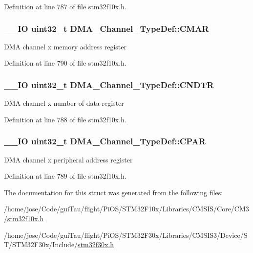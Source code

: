 Definition at line 787 of file stm32f10x.\-h.

\hypertarget{struct_d_m_a___channel___type_def_a7a9886b5f9e0edaf5ced3d1870b33ad7}{
\subsubsection[{C\-M\-A\-R}]{\setlength{\rightskip}{0pt plus 5cm}\-\_\-\-\_\-\-I\-O {\bf uint32\-\_\-t} D\-M\-A\-\_\-\-Channel\-\_\-\-Type\-Def\-::\-C\-M\-A\-R}}\label{struct_d_m_a___channel___type_def_a7a9886b5f9e0edaf5ced3d1870b33ad7}
D\-M\-A channel x memory address register 

Definition at line 790 of file stm32f10x.\-h.

\hypertarget{struct_d_m_a___channel___type_def_af1c675e412fb96e38b6b4630b88c5676}{
\subsubsection[{C\-N\-D\-T\-R}]{\setlength{\rightskip}{0pt plus 5cm}\-\_\-\-\_\-\-I\-O {\bf uint32\-\_\-t} D\-M\-A\-\_\-\-Channel\-\_\-\-Type\-Def\-::\-C\-N\-D\-T\-R}}\label{struct_d_m_a___channel___type_def_af1c675e412fb96e38b6b4630b88c5676}
D\-M\-A channel x number of data register 

Definition at line 788 of file stm32f10x.\-h.

\hypertarget{struct_d_m_a___channel___type_def_a8ce1c9c2742eaaa0e97ddbb3a06154cc}{
\subsubsection[{C\-P\-A\-R}]{\setlength{\rightskip}{0pt plus 5cm}\-\_\-\-\_\-\-I\-O {\bf uint32\-\_\-t} D\-M\-A\-\_\-\-Channel\-\_\-\-Type\-Def\-::\-C\-P\-A\-R}}\label{struct_d_m_a___channel___type_def_a8ce1c9c2742eaaa0e97ddbb3a06154cc}
D\-M\-A channel x peripheral address register 

Definition at line 789 of file stm32f10x.\-h.



The documentation for this struct was generated from the following files\-:\begin{DoxyCompactItemize}
\item 
/home/jose/\-Code/gui\-Tau/flight/\-Pi\-O\-S/\-S\-T\-M32\-F10x/\-Libraries/\-C\-M\-S\-I\-S/\-Core/\-C\-M3/\hyperlink{stm32f10x_8h}{stm32f10x.\-h}\item 
/home/jose/\-Code/gui\-Tau/flight/\-Pi\-O\-S/\-S\-T\-M32\-F30x/\-Libraries/\-C\-M\-S\-I\-S3/\-Device/\-S\-T/\-S\-T\-M32\-F30x/\-Include/\hyperlink{stm32f30x_8h}{stm32f30x.\-h}\end{DoxyCompactItemize}
